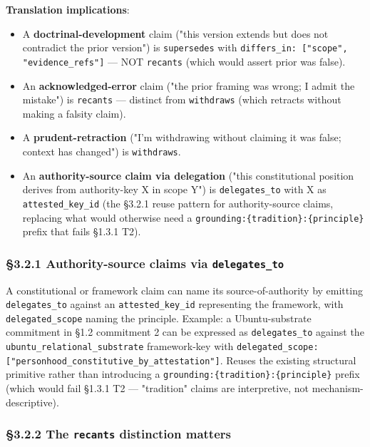 \documentclass[11pt]{article}
\begin{document}
\textbf{Translation implications}:


\begin{itemize}\setlength\itemsep{0pt}
\item A \textbf{doctrinal-development} claim ("this version extends but does not contradict the prior version") is \texttt{supersedes} with \texttt{differs\_in: ["scope", "evidence\_refs"]} — NOT \texttt{recants} (which would assert prior was false).
\item An \textbf{acknowledged-error} claim ("the prior framing was wrong; I admit the mistake") is \texttt{recants} — distinct from \texttt{withdraws} (which retracts without making a falsity claim).
\item A \textbf{prudent-retraction} ("I'm withdrawing without claiming it was false; context has changed") is \texttt{withdraws}.
\item An \textbf{authority-source claim via delegation} ("this constitutional position derives from authority-key X in scope Y") is \texttt{delegates\_to} with X as \texttt{attested\_key\_id} (the §3.2.1 reuse pattern for authority-source claims, replacing what would otherwise need a \texttt{grounding:\{tradition\}:\{principle\}} prefix that fails §1.3.1 T2).
\end{itemize}


\subsubsection*{§3.2.1 Authority-source claims via \texttt{delegates\_to}}


A constitutional or framework claim can name its source-of-authority by emitting \texttt{delegates\_to} against an \texttt{attested\_key\_id} representing the framework, with \texttt{delegated\_scope} naming the principle. Example: a Ubuntu-substrate commitment in §1.2 commitment 2 can be expressed as \texttt{delegates\_to} against the \texttt{ubuntu\_relational\_substrate} framework-key with \texttt{delegated\_scope: ["personhood\_constitutive\_by\_attestation"]}. Reuses the existing structural primitive rather than introducing a \texttt{grounding:\{tradition\}:\{principle\}} prefix (which would fail §1.3.1 T2 — "tradition" claims are interpretive, not mechanism-descriptive).


\subsubsection*{§3.2.2 The \texttt{recants} distinction matters}
\end{document}
